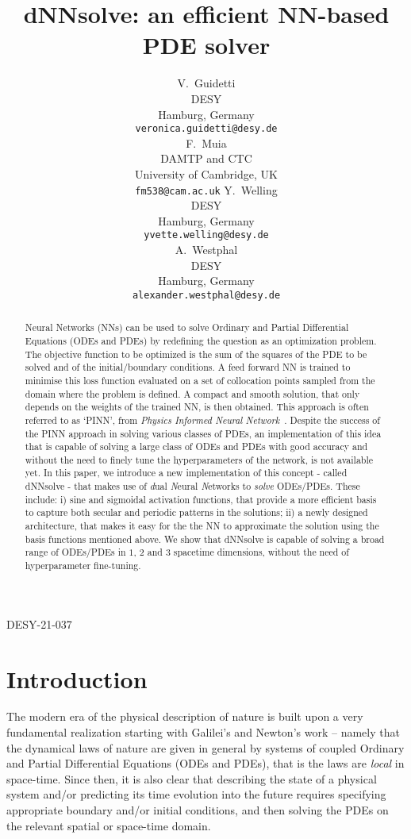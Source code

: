 \documentclass{article}
\title{\textsf{dNNsolve}: an efficient NN-based PDE solver}
\author{%
V.~Guidetti\\
  DESY\\
  Hamburg, Germany\\
  \texttt{veronica.guidetti@desy.de}\\
 \And
 F.~Muia\\
 DAMTP and CTC\\
 University of Cambridge, UK\\
 \texttt{fm538@cam.ac.uk}
 \And
 Y.~Welling\\
  DESY\\
  Hamburg, Germany\\
  \texttt{yvette.welling@desy.de}\\
  \And
  A.~Westphal\\
  DESY\\
  Hamburg, Germany\\
  \texttt{alexander.westphal@desy.de}
}
\begin{document}
\begin{flushright}
DESY-21-037
\end{flushright}

\maketitle


\begin{abstract}
Neural Networks (NNs) can be used to solve Ordinary and Partial Differential Equations (ODEs and PDEs) by redefining the question as an optimization problem. The objective function to be optimized is the sum of the squares of the PDE to be solved and of the initial/boundary conditions. A feed forward NN is trained to minimise this loss function evaluated on a set of collocation points sampled from the domain where the problem is defined. A compact and smooth solution, that only depends on the weights of the trained NN, is then obtained. This approach is often referred to as ‘PINN’, from \textit{Physics Informed Neural Network}~\cite{raissi2017physics_1, raissi2017physics_2}. Despite the success of the PINN approach in solving various classes of PDEs, an implementation of this idea that is capable of solving a large class of ODEs and PDEs with good accuracy and without the need to finely tune the hyperparameters of the network, is not available yet. In this paper, we introduce a new implementation of this concept - called \textsf{dNNsolve} - that makes use of {\it d}ual {\it N}eural {\it N}etworks to {\it solve} ODEs/PDEs. These include: i) sine and sigmoidal activation functions, that provide a more efficient basis to capture both secular and periodic patterns in the solutions; ii) a newly designed architecture, that makes it easy for the the NN to approximate the solution using the basis functions mentioned above. We show that \textsf{dNNsolve} is capable of solving a broad range of ODEs/PDEs in $1$, $2$ and $3$ spacetime dimensions, without the need of hyperparameter fine-tuning.
\end{abstract}

\section{Introduction}
The modern era of the physical description of nature is built upon a very fundamental realization starting with Galilei's and Newton's work -- namely that the dynamical laws of nature are given in general by systems of coupled Ordinary and Partial Differential Equations (ODEs and PDEs), that is the laws are \emph{local} in space-time. Since then, it is also clear that describing the state of a physical system and/or predicting its time evolution into the future requires specifying appropriate boundary and/or initial conditions, and then solving the PDEs on the relevant spatial or space-time domain. 
\end{document}
